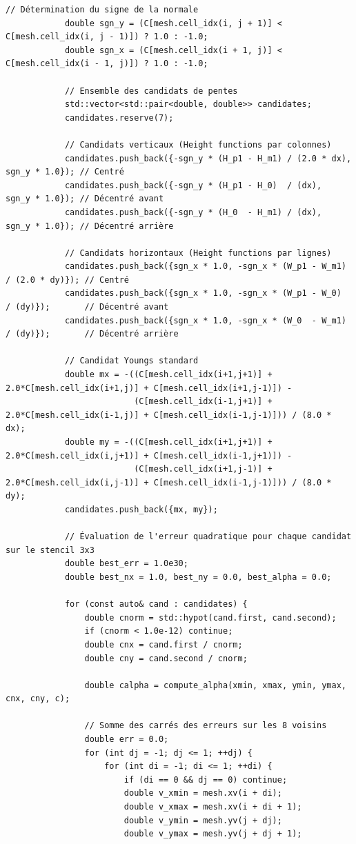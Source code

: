 \documentclass[10pt,a4paper,oneside]{book}
\begin{document}
\begin{lstlisting}[language={[11]C++}]
            // Détermination du signe de la normale
            double sgn_y = (C[mesh.cell_idx(i, j + 1)] < C[mesh.cell_idx(i, j - 1)]) ? 1.0 : -1.0;
            double sgn_x = (C[mesh.cell_idx(i + 1, j)] < C[mesh.cell_idx(i - 1, j)]) ? 1.0 : -1.0;

            // Ensemble des candidats de pentes
            std::vector<std::pair<double, double>> candidates;
            candidates.reserve(7);

            // Candidats verticaux (Height functions par colonnes)
            candidates.push_back({-sgn_y * (H_p1 - H_m1) / (2.0 * dx), sgn_y * 1.0}); // Centré
            candidates.push_back({-sgn_y * (H_p1 - H_0)  / (dx),       sgn_y * 1.0}); // Décentré avant
            candidates.push_back({-sgn_y * (H_0  - H_m1) / (dx),       sgn_y * 1.0}); // Décentré arrière

            // Candidats horizontaux (Height functions par lignes)
            candidates.push_back({sgn_x * 1.0, -sgn_x * (W_p1 - W_m1) / (2.0 * dy)}); // Centré
            candidates.push_back({sgn_x * 1.0, -sgn_x * (W_p1 - W_0)  / (dy)});       // Décentré avant
            candidates.push_back({sgn_x * 1.0, -sgn_x * (W_0  - W_m1) / (dy)});       // Décentré arrière

            // Candidat Youngs standard
            double mx = -((C[mesh.cell_idx(i+1,j+1)] + 2.0*C[mesh.cell_idx(i+1,j)] + C[mesh.cell_idx(i+1,j-1)]) -
                          (C[mesh.cell_idx(i-1,j+1)] + 2.0*C[mesh.cell_idx(i-1,j)] + C[mesh.cell_idx(i-1,j-1)])) / (8.0 * dx);
            double my = -((C[mesh.cell_idx(i+1,j+1)] + 2.0*C[mesh.cell_idx(i,j+1)] + C[mesh.cell_idx(i-1,j+1)]) -
                          (C[mesh.cell_idx(i+1,j-1)] + 2.0*C[mesh.cell_idx(i,j-1)] + C[mesh.cell_idx(i-1,j-1)])) / (8.0 * dy);
            candidates.push_back({mx, my});

            // Évaluation de l'erreur quadratique pour chaque candidat sur le stencil 3x3
            double best_err = 1.0e30;
            double best_nx = 1.0, best_ny = 0.0, best_alpha = 0.0;

            for (const auto& cand : candidates) {
                double cnorm = std::hypot(cand.first, cand.second);
                if (cnorm < 1.0e-12) continue;
                double cnx = cand.first / cnorm;
                double cny = cand.second / cnorm;

                double calpha = compute_alpha(xmin, xmax, ymin, ymax, cnx, cny, c);

                // Somme des carrés des erreurs sur les 8 voisins
                double err = 0.0;
                for (int dj = -1; dj <= 1; ++dj) {
                    for (int di = -1; di <= 1; ++di) {
                        if (di == 0 && dj == 0) continue;
                        double v_xmin = mesh.xv(i + di);
                        double v_xmax = mesh.xv(i + di + 1);
                        double v_ymin = mesh.yv(j + dj);
                        double v_ymax = mesh.yv(j + dj + 1);


\end{lstlisting}
\end{document}
